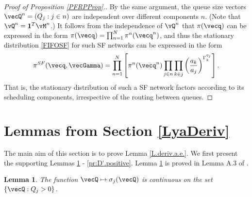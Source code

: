 \documentclass{amsart}
\newtheorem{lemma}{Lemma}
\newtheorem{proposition}{Proposition}
\begin{document}
\begin{proof}[Proof of Proposition \ref{PFRPProp}.]
By the same argument,  the queue size vectors  $\vecQ^n=(Q_j: j\in n)$ are independent
over different components $n$.  (Note that $\vQ^n = \mathbf{1}^T \vM^n$.)
It follows from the independence of $\vQ^n$ that $\pi(\vecq)$ can be expressed in the form $\pi(\vecq)=\prod_{n=1}^N \pi^n(\vecq^n)$, and thus the stationary distribution \eqref{FIFOSF} for such SF networks can be expressed in the form
\[
\pi^{SF} (\vecq,\vecGamma) = \prod_{n=1}^N \left[  {\pi^n(\vecq^n)} \prod_{j\in n} \prod_{k\in j} \left(\frac{a_k}{a_j}\right)^{\Gamma_k^{q_j}}\right].
\]
That is, the stationary distribution of such a SF network factors according to its scheduling components, irrespective of the routing between queues.
\end{proof}

\fi

\section{Lemmas from Section \ref{LyaDeriv}}

The main aim of this section is to prove Lemma \ref{L.deriv.a.e.}. We first present the supporting Lemmas \ref{SigCont} - \ref{pr:D'.positive}.  Lemma \ref{SigCont} 
is proved in  Lemma A.3 of \cite{KeWi04}.

\begin{lemma}\label{SigCont} 
The function $\vecQ \mapsto \sigma_j(\vecQ)$ is continuous on the set $\{ \vecQ : Q_j>0\}$.
\end{lemma}

\iffalse
The $D_j(t)$ are Lipschitz, then by  \eqref{eq:ADk}
also the $A_k(t)$ are Lipschitz, whenever the classes are not source classes, 
finally for the source classes the Lipschitz property it is due to the 
i.i.d. assumption and the finite means.
\fi

\iffalse
\begin{proposition}\label{deriv.D}
\begin{subequations}
\begin{align}\label{PF.forD}
\vecD'(t) &\in \operatorname*{arg\,max}_{\sigma \in \mC} \sum_{j\in\mJ} Q_j(t) \log \sigma_j & t - \mbox{a.e.} \\
D'_j(t) &= A'_j(t) & \mbox{if } Q'_j(t)=0
\end{align}
\end{subequations}
\end{proposition}
\fi
\end{document}
